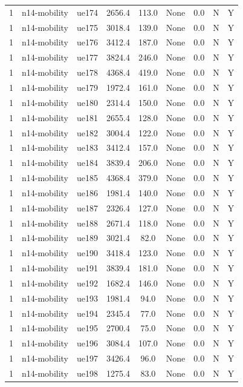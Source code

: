 \begin{table}[ht]
\begin{tabular}{|c|c|c|c|c|c|c|c|c|}
1 & n14-mobility & ue174 & 2656.4 & 113.0 & None & 0.0 & N & Y \\
1 & n14-mobility & ue175 & 3018.4 & 139.0 & None & 0.0 & N & Y \\
1 & n14-mobility & ue176 & 3412.4 & 187.0 & None & 0.0 & N & Y \\
1 & n14-mobility & ue177 & 3824.4 & 246.0 & None & 0.0 & N & Y \\
1 & n14-mobility & ue178 & 4368.4 & 419.0 & None & 0.0 & N & Y \\
1 & n14-mobility & ue179 & 1972.4 & 161.0 & None & 0.0 & N & Y \\
1 & n14-mobility & ue180 & 2314.4 & 150.0 & None & 0.0 & N & Y \\
1 & n14-mobility & ue181 & 2655.4 & 128.0 & None & 0.0 & N & Y \\
1 & n14-mobility & ue182 & 3004.4 & 122.0 & None & 0.0 & N & Y \\
1 & n14-mobility & ue183 & 3412.4 & 157.0 & None & 0.0 & N & Y \\
1 & n14-mobility & ue184 & 3839.4 & 206.0 & None & 0.0 & N & Y \\
1 & n14-mobility & ue185 & 4368.4 & 379.0 & None & 0.0 & N & Y \\
1 & n14-mobility & ue186 & 1981.4 & 140.0 & None & 0.0 & N & Y \\
1 & n14-mobility & ue187 & 2326.4 & 127.0 & None & 0.0 & N & Y \\
1 & n14-mobility & ue188 & 2671.4 & 118.0 & None & 0.0 & N & Y \\
1 & n14-mobility & ue189 & 3021.4 & 82.0 & None & 0.0 & N & Y \\
1 & n14-mobility & ue190 & 3418.4 & 123.0 & None & 0.0 & N & Y \\
1 & n14-mobility & ue191 & 3839.4 & 181.0 & None & 0.0 & N & Y \\
1 & n14-mobility & ue192 & 1682.4 & 146.0 & None & 0.0 & N & Y \\
1 & n14-mobility & ue193 & 1981.4 & 94.0 & None & 0.0 & N & Y \\
1 & n14-mobility & ue194 & 2345.4 & 77.0 & None & 0.0 & N & Y \\
1 & n14-mobility & ue195 & 2700.4 & 75.0 & None & 0.0 & N & Y \\
1 & n14-mobility & ue196 & 3084.4 & 107.0 & None & 0.0 & N & Y \\
1 & n14-mobility & ue197 & 3426.4 & 96.0 & None & 0.0 & N & Y \\
1 & n14-mobility & ue198 & 1275.4 & 83.0 & None & 0.0 & N & Y \\

\end{tabular}
\end{table}
